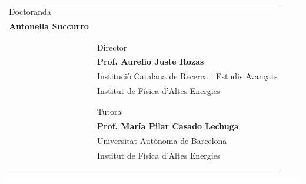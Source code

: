 \documentclass[titlepage]{article}
\begin{document}
\vspace{80pt} \\
\centering
\begin{tabular}{p{6cm}p{9cm}}
\large Doctoranda &  \\
\Large \bfseries Antonella Succurro & \\
 & \\
 & \\
 & \large Director \\
 &\Large \bfseries Prof. Aurelio Juste Rozas\\
 &\large Instituciò Catalana de Recerca i Estudis Avan\c{c}ats\\
 &\large Institut de F\'isica d’Altes Energies\\
 & \\
 & \\
 & \large Tutora \\
 &\Large \bfseries Prof. Mar\'ia Pilar Casado Lechuga\\
 &\large Universitat Autònoma de Barcelona\\
 &\large Institut de F\'isica d’Altes Energies\\
 & \\
 & \\
\end{tabular}
\hrule \vspace{6pt}
\large 
\end{document}
